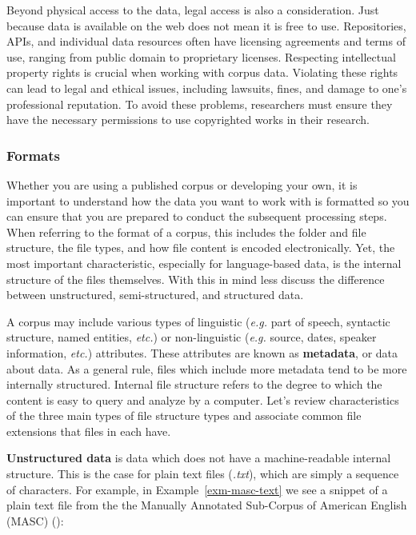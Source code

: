 \documentclass[
  letterpaper,
]{latex/krantz}
\theoremstyle{definition}
\theoremstyle{remark}
\begin{document}
Beyond physical access to the data, legal access is also a
consideration. Just because data is available on the web does not mean
it is free to use. Repositories, APIs, and individual data resources
often have licensing agreements and terms of use, ranging from public
domain to proprietary licenses. Respecting intellectual property rights
is crucial when working with corpus data. Violating these rights can
lead to legal and ethical issues, including lawsuits, fines, and damage
to one's professional reputation. To avoid these problems, researchers
must ensure they have the necessary permissions to use copyrighted works
in their research.

\subsubsection{Formats}\label{formats}

Whether you are using a published corpus or developing your own, it is
important to understand how the data you want to work with is formatted
so you can ensure that you are prepared to conduct the subsequent
processing steps. When referring to the format of a corpus, this
includes the folder and file structure, the file types, and how file
content is encoded electronically. Yet, the most important
characteristic, especially for language-based data, is the internal
structure of the files themselves. With this in mind less discuss the
difference between unstructured, semi-structured, and structured data.

A corpus may include various types of linguistic (\emph{e.g.} part of
speech, syntactic structure, named entities, \emph{etc.}) or
non-linguistic (\emph{e.g.} source, dates, speaker information,
\emph{etc.}) attributes. These attributes are known as
\textbf{metadata}, or data about data. As a general rule, files which
include more metadata tend to be more internally structured. Internal
file structure refers to the degree to which the content is easy to
query and analyze by a computer. Let's review characteristics of the
three main types of file structure types and associate common file
extensions that files in each have.

\textbf{Unstructured data} is data which does not have a
machine-readable internal structure. This is the case for plain text
files (\emph{.txt}), which are simply a sequence of characters. For
example, in Example~\ref{exm-masc-text} we see a snippet of a plain text
file from the the Manually Annotated Sub-Corpus of American English
(MASC) ():
\end{document}
